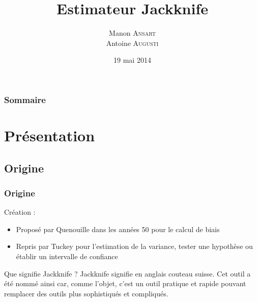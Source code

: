 \documentclass[handout]{beamer}
\title{
	Estimateur Jackknife
}
\author{
	Manon \textsc{Ansart} \\
	\vspace{10px}
	Antoine \textsc{Augusti}
}
\date{19 mai 2014}
\begin{document}
	\begin{frame}[plain]
		\titlepage
	\end{frame}

	\begin{frame}[plain]
		\frametitle{Sommaire}
		\tableofcontents
	\end{frame}


	\section{Présentation}

		\subsection{Origine}
		\begin{frame}
			\frametitle{Origine}

			Création :
			\begin{itemize}
				\item Proposé par Quenouille dans les années 50 pour le calcul de biais
				\item Repris par Tuckey pour l'estimation de la variance, tester une hypothèse ou établir un intervalle de confiance
			\end{itemize}


			\vspace{20px}

			\begin{exampleblock}{Que signifie Jackknife ?}
				Jackknife signifie en anglais couteau suisse. Cet outil a été nommé ainsi car, comme l'objet, c'est un outil pratique et rapide pouvant remplacer des outils plus sophistiqués et compliqués.
			\end{exampleblock}
		\end{frame}


\end{document}
